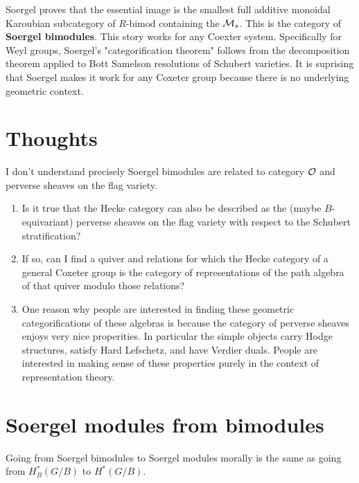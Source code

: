 \documentclass[12pt]{article}
\begin{document}
Soergel proves that the essential image is the smallest full additive monoidal Karoubian subcategory of $R\text{-bimod}$ containing
the ${\mathcal{M}}_s$. This is the category of \textbf{Soergel bimodules}. This story works 
for any Coexter system. Specifically for Weyl groups, Soergel's "categorification theorem" follows from 
the decomposition theorem applied to Bott Samelson resolutions of Schubert varieties.
It is suprising that Soergel makes it work for any Coxeter group because there is 
no underlying geometric context.

\section{Thoughts}
I don't understand precisely Soergel bimodules are related to category ${\mathcal{O}}$ 
and perverse sheaves on the flag variety.
\begin{enumerate}
    \item Is it true that the Hecke category can also be described as the (maybe $B$-equivariant)
    perverse sheaves on the flag variety with respect to the Schubert stratification?
    \item If so, can I find a quiver and relations for which the Hecke category of a general 
    Coxeter group is the category of representations of the path algebra of that quiver modulo those relations?
    \item One reason why people are interested in finding these 
    geometric categorifications of these algebras is because the category of perverse sheaves enjoys
    very nice properities. In particular the simple objects carry Hodge structures, satisfy Hard Lefschetz, 
    and have Verdier duals. People are interested in making sense of these properties purely in the context
    of representation theory.
\end{enumerate}

\section{Soergel modules from bimodules}
Going from Soergel bimodules to Soergel modules morally is the same as 
going from $H^*_B(G/B)$ to $H^*(G/B)$. 
\end{document}
